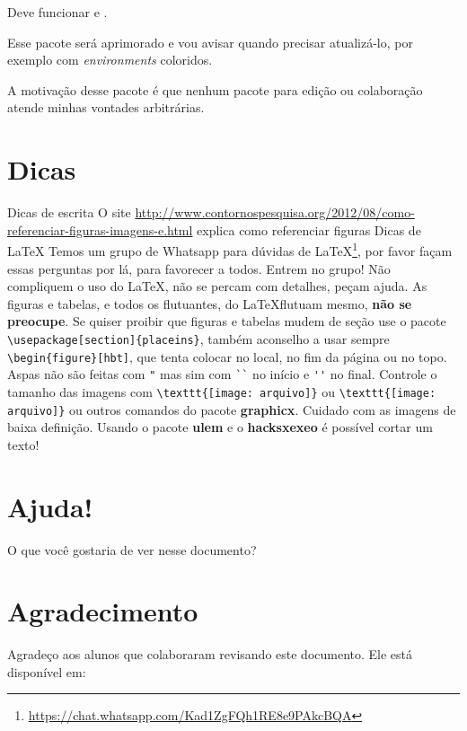 \documentclass{article}
\begin{document}
Deve funcionar  e .

Esse pacote será aprimorado e vou avisar quando precisar atualizá-lo, por exemplo com \textit{environments} coloridos.

A motivação desse pacote é que nenhum pacote para edição ou colaboração atende minhas vontades arbitrárias.

\section{Dicas}
\begin{outline}
\1 Dicas de escrita
\2 O site \url{http://www.contornospesquisa.org/2012/08/como-referenciar-figuras-imagens-e.html} explica como referenciar figuras
\1 Dicas de \LaTeX
\2 Temos um grupo de Whatsapp para dúvidas de \LaTeX\footnote{\url{https://chat.whatsapp.com/Kad1ZgFQh1RE8e9PAkcBQA}}, por favor façam essas perguntas por lá, para favorecer a todos. Entrem no grupo!
\2 Não compliquem o uso do \LaTeX, não se percam com detalhes, peçam ajuda. 
\2 As figuras e tabelas, e todos os flutuantes, do \LaTeX flutuam mesmo, \textbf{não se preocupe}. 
\2 Se quiser proibir que figuras e tabelas mudem de seção use o pacote \verb!\usepackage[section]{placeins}!, também aconselho a usar sempre \verb!\begin{figure}[hbt]!, que tenta colocar no local, no fim da página ou no topo.
\2 Aspas não são feitas com \verb!"! mas sim com \verb!``! no início e \verb!''! no final.
\2 Controle o tamanho das imagens com \verb!\texttt{[image: arquivo]}! ou \verb!\texttt{[image: arquivo]}! ou outros comandos do pacote \textbf{graphicx}.
\2 Cuidado com as imagens de baixa definição. 
\2 Usando o pacote \textbf{ulem} e o \textbf{hacksxexeo} é possível cortar um texto! 
\end{outline}
\section{Ajuda!}
O que você gostaria de ver nesse documento? 
\section{Agradecimento}
Agradeço aos alunos que colaboraram revisando este documento. Ele está disponível em: 

\printbibliography
\end{document}
